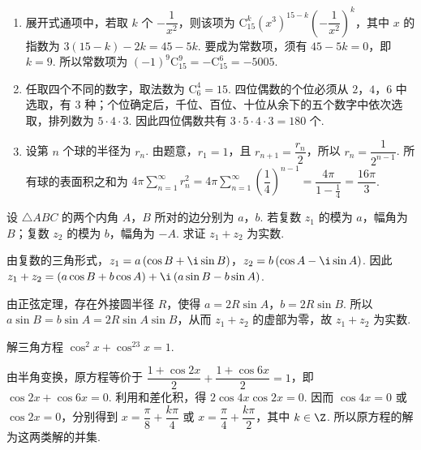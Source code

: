 \begin{solution}
\begin{enumerate}
\item 展开式通项中，若取 \(k\) 个 \(-\dfrac{1}{x^2}\)，则该项为 \(\mathrm C_{15}^{k}\left(x^3\right)^{15-k}\left(-\dfrac{1}{x^2}\right)^k\)，其中 \(x\) 的指数为 \(3(15-k)-2k=45-5k\). 要成为常数项，须有 \(45-5k=0\)，即 \(k=9\). 所以常数项为 \((-1)^9\mathrm C_{15}^{9}=-\mathrm C_{15}^{6}=-5005\).
\item 任取四个不同的数字，取法数为 \(\mathrm C_6^4=15\). 四位偶数的个位必须从 \(2\)，\(4\)，\(6\) 中选取，有 \(3\) 种；个位确定后，千位、百位、十位从余下的五个数字中依次选取，排列数为 \(5\cdot4\cdot3\). 因此四位偶数共有 \(3\cdot5\cdot4\cdot3=180\) 个.
\item 设第 \(n\) 个球的半径为 \(r_n\). 由题意，\(r_1=1\)，且 \(r_{n+1}=\dfrac{r_n}{2}\)，所以 \(r_n=\dfrac{1}{2^{n-1}}\). 所有球的表面积之和为 \(4\pi\sum_{n=1}^{\infty}r_n^2=4\pi\sum_{n=1}^{\infty}\left(\dfrac14\right)^{n-1}=\dfrac{4\pi}{1-\frac14}=\dfrac{16\pi}{3}\).
\end{enumerate}
\end{solution}

\begin{problem}

设 \(\triangle ABC\) 的两个内角 \(A\)，\(B\) 所对的边分别为 \(a\)，\(b\). 若复数 \(z_1\) 的模为 \(a\)，幅角为 \(B\)；复数 \(z_2\) 的模为 \(b\)，幅角为 \(-A\). 求证 \(z_1+z_2\) 为实数.
\end{problem}

\begin{solution}
由复数的三角形式，\(z_1=a\left(\cos B+\i\sin B\right)\)，\(z_2=b\left(\cos A-\i\sin A\right)\). 因此
\(z_1+z_2=\left(a\cos B+b\cos A\right)+\i\left(a\sin B-b\sin A\right)\).

由正弦定理，存在外接圆半径 \(R\)，使得 \(a=2R\sin A\)，\(b=2R\sin B\). 所以 \(a\sin B=b\sin A=2R\sin A\sin B\)，从而 \(z_1+z_2\) 的虚部为零，故 \(z_1+z_2\) 为实数.
\end{solution}

\begin{problem}

解三角方程 \(\cos^2x+\cos^23x=1\).
\end{problem}

\begin{solution}
由半角变换，原方程等价于 \(\dfrac{1+\cos2x}{2}+\dfrac{1+\cos6x}{2}=1\)，即 \(\cos2x+\cos6x=0\). 利用和差化积，得 \(2\cos4x\cos2x=0\). 因而
\(\cos4x=0\) 或 \(\cos2x=0\)，分别得到 \(x=\dfrac{\pi}{8}+\dfrac{k\pi}{4}\) 或 \(x=\dfrac{\pi}{4}+\dfrac{k\pi}{2}\)，其中 \(k\in\Z\). 所以原方程的解为这两类解的并集.
\end{solution}

